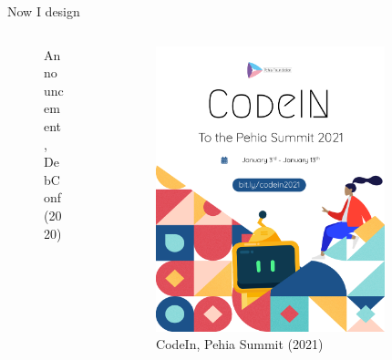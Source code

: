 \documentclass[presentation]{beamer}
\begin{document}
\begin{frame}[label={sec:orged958be}]{Now I design}
\begin{columns}
\begin{column}{0.25\columnwidth}
\begin{figure}[htbp]
\caption{Announcement, DebConf (2020)}
\end{figure}
\end{column}
\begin{column}{0.25\columnwidth}
\begin{figure}[htbp]
\centering
\includegraphics[width=.9\linewidth]{././codein.png}
\caption{CodeIn, Pehia Summit (2021)}
\end{figure}
\end{column}
\begin{column}{0.25\columnwidth}
\begin{figure}[htbp]
\centering

\end{figure}
\end{column}
\end{columns}
\end{frame}
\end{document}
